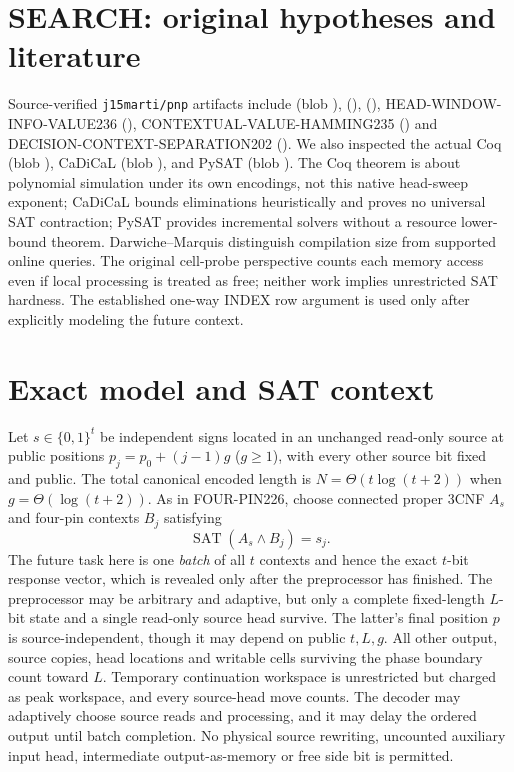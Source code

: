 \documentclass[10pt]{article}
\begin{document}
\section{SEARCH: original hypotheses and literature}
Source-verified \texttt{j15marti/pnp} artifacts include  (blob ),  (),  (), HEAD-WINDOW-INFO-VALUE236 (), CONTEXTUAL-VALUE-HAMMING235 () and DECISION-CONTEXT-SEPARATION202 (). We also inspected the actual Coq  (blob ), CaDiCaL  (blob ), and PySAT  (blob ). The Coq theorem is about polynomial simulation under its own encodings, not this native head-sweep exponent; CaDiCaL bounds eliminations heuristically and proves no universal SAT contraction; PySAT provides incremental solvers without a resource lower-bound theorem. Darwiche--Marquis \cite{dm} distinguish compilation size from supported online queries. The original cell-probe perspective \cite{fs} counts each memory access even if local processing is treated as free; neither work implies unrestricted SAT hardness. The established one-way INDEX row argument is used only after explicitly modeling the future context.

\section{Exact model and SAT context}
Let $s\in\{0,1\}^t$ be independent signs located in an unchanged read-only source at public positions $p_j=p_0+(j-1)g$ ($g\ge1$), with every other source bit fixed and public. The total canonical encoded length is $N=\Theta(t\log(t+2))$ when $g=\Theta(\log(t+2))$. As in FOUR-PIN226, choose connected proper 3CNF $A_s$ and four-pin contexts $B_j$ satisfying
\[\operatorname{SAT}(A_s\wedge B_j)=s_j.\]
The future task here is one \emph{batch} of all $t$ contexts and hence the exact $t$-bit response vector, which is revealed only after the preprocessor has finished. The preprocessor may be arbitrary and adaptive, but only a complete fixed-length $L$-bit state and a single read-only source head survive. The latter's final position $p$ is source-independent, though it may depend on public $t,L,g$. All other output, source copies, head locations and writable cells surviving the phase boundary count toward $L$. Temporary continuation workspace is unrestricted but charged as peak workspace, and every source-head move counts. The decoder may adaptively choose source reads and processing, and it may delay the ordered output until batch completion. No physical source rewriting, uncounted auxiliary input head, intermediate output-as-memory or free side bit is permitted.
\end{document}
